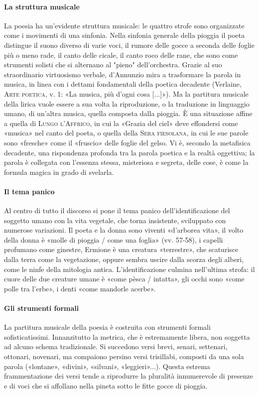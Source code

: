 \documentclass{book}
\newcounter{mar}
\begin{document}
\paragraph{La struttura musicale} La poesia ha un'evidente struttura musicale: le quattro strofe sono organizzate come i movimenti di una sinfonia. Nella sinfonia generale della pioggia il poeta distingue il suono diverso di varie voci, il rumore delle gocce a seconda delle foglie più o meno rade, il canto delle cicale, il canto roco delle rane, che sono come strumenti solisti che si alternano al "pieno" dell'orchestra. Grazie al suo straordinario virtuosismo verbale, d'Annunzio mira a trasformare la parola in musica, in linea con i dettami fondamentali della poetica decadente (Verlaine, \textsc{Arte poetica}, v. 1: «La musica, più d'ogni cosa [...]»). Ma la partitura musicale della lirica vuole essere a sua volta la riproduzione, o la traduzione in linguaggio umano, di un'altra musica, quella composta dalla pioggia. È una situazione affine a quella di \textsc{Lungo l'Affrico}, in cui la «Grazia del ciel» deve effondersi come «musica» nel canto del poeta, o quella della \textsc{Sera fiesolana}, in cui le sue parole sono «fresche» come il «fruscio» delle foglie del gelso. Vi è, secondo la metafisica decadente, una rispondenza profonda tra la parola poetica e la realtà oggettiva; la parola è collegata con l'essenza stessa, misteriosa e segreta, delle cose, è come la formula magica in grado di svelarla.

\paragraph{Il tema panico} Al centro di tutto il discorso si pone il tema panico dell'identificazione del soggetto umano con la vita vegetale, che torna insistente, sviluppato con numerose variazioni. Il poeta e la donna sono viventi «d'arborea vita», il volto della donna è «molle di pioggia / come una foglia» (vv. 57-58), i capelli profumano come ginestre, Ermione è una creatura «terrestre», che scaturisce dalla terra come la vegetazione, oppure sembra uscire dalla scorza degli alberi, come le ninfe della mitologia antica. L'identificazione culmina nell'ultima strofa: il cuore delle due creature umane è «come pèsca / intatta», gli occhi sono «come polle tra l'erbe», i denti «come mandorle acerbe».

\paragraph{Gli strumenti formali} La partitura musicale della poesia è costruita con strumenti formali sofisticatissimi. Innanzitutto la metrica, che è estremamente libera, non soggetta ad alcuno schema tradizionale. Si succedono versi brevi, senari, settenari, ottonari, novenari, ma compaiono persino versi trisillabi, composti da una sola parola («lontane», «divini», «silvani», «leggieri»...). Questa estrema frammentazione dei versi tende a riprodurre la pluralità innumerevole di presenze e di voci che si affollano nella pineta sotto le fitte gocce di pioggia.
\end{document}
